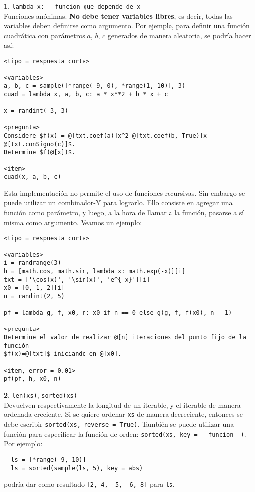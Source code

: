 \documentclass[12pt]{article}
\theoremstyle{definition}
\newtheorem{funcion}{}[section]
\begin{document}
\begin{funcion}
  \verb|lambda x: __funcion que depende de x__| \\[1ex]
  Funciones anónimas. \textbf{No debe tener variables libres}, es decir, todas las variables deben definirse como argumento. Por ejemplo, para definir una función cuadrática con parámetros $a$, $b$, $c$ generados de manera aleatoria, se podría hacer así:
\small
\begin{verbatim}
<tipo = respuesta corta>

<variables>
a, b, c = sample([*range(-9, 0), *range(1, 10)], 3)
cuad = lambda x, a, b, c: a * x**2 + b * x + c

x = randint(-3, 3)

<pregunta>
Considere $f(x) = @[txt.coef(a)]x^2 @[txt.coef(b, True)]x @[txt.conSigno(c)]$. 
Determine $f(@[x])$.

<item>
cuad(x, a, b, c)
\end{verbatim}
\normalsize

Esta implementación no permite el uso de funciones recursivas. Sin embargo se puede utilizar un combinador-Y para lograrlo. Ello consiste en agregar una función como parámetro, y luego, a la hora de llamar a la función, pasarse a sí misma como argumento. Veamos un ejemplo:

\small
\begin{verbatim}
<tipo = respuesta corta>

<variables>
i = randrange(3)
h = [math.cos, math.sin, lambda x: math.exp(-x)][i]
txt = ['\cos(x)', '\sin(x)', 'e^{-x}'][i]
x0 = [0, 1, 2][i]
n = randint(2, 5)

pf = lambda g, f, x0, n: x0 if n == 0 else g(g, f, f(x0), n - 1)

<pregunta>
Determine el valor de realizar @[n] iteraciones del punto fijo de la función 
$f(x)=@[txt]$ iniciando en @[x0].

<item, error = 0.01>
pf(pf, h, x0, n)
\end{verbatim}
\normalsize

\end{funcion}

\begin{funcion}
  \verb|len(xs)|, \verb|sorted(xs)| \\[1ex]
  Devuelven respectivamente la longitud de un iterable, y el iterable de manera ordenada creciente. Si se quiere ordenar \verb|xs| de manera decreciente, entonces se debe escribir \verb|sorted(xs, reverse = True)|. También se puede utilizar una función para especificar la función de orden: \newline
  \verb|sorted(xs, key = __funcion__)|. Por ejemplo:
  \small
  \begin{verbatim}
  ls = [*range(-9, 10)]
  ls = sorted(sample(ls, 5), key = abs)
  \end{verbatim}
  \normalsize
  podría dar como resultado \verb|[2, 4, -5, -6, 8]| para \verb|ls|.
\end{funcion}
\end{document}
